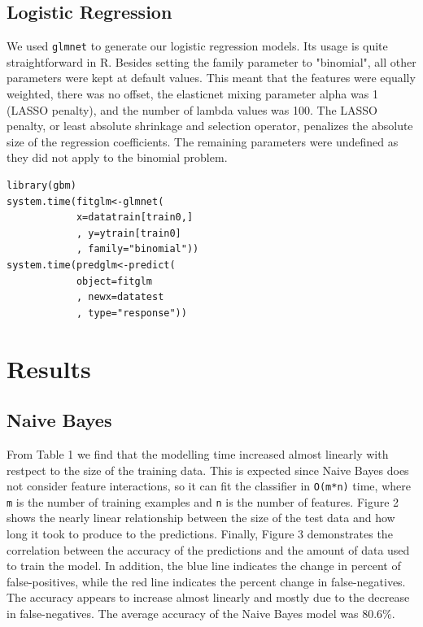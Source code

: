 \documentclass[twoside]{article}
\begin{document}
\begin{multicols}{2}
\subsection{Logistic Regression}
We used \texttt{glmnet} to generate our logistic regression models. Its usage is quite straightforward in R. Besides setting the family parameter to "binomial", all other parameters were kept at default values. This meant that the features were equally weighted, there was no offset, the elasticnet mixing parameter alpha was 1 (LASSO penalty), and the number of lambda values was 100\cite{4}. The LASSO penalty, or least absolute shrinkage and selection operator, penalizes the absolute size of the regression coefficients. The remaining parameters were undefined as they did not apply to the binomial problem.
\begin{verbatim}
library(gbm)
system.time(fitglm<-glmnet(
            x=datatrain[train0,]
            , y=ytrain[train0]
            , family="binomial"))
system.time(predglm<-predict(
            object=fitglm
            , newx=datatest
            , type="response"))
\end{verbatim}


\section{Results}

\subsection{Naive Bayes}

From Table 1 we find that the modelling time increased almost linearly with restpect to the size of the training data. This is expected since Naive Bayes does not consider feature interactions, so it can fit the classifier in \texttt{O(m*n)} time, where \texttt{m} is the number of training examples and \texttt{n} is the number of features. Figure 2 shows the nearly linear relationship between the size of the test data and how long it took to produce to the predictions. Finally, Figure 3 demonstrates the correlation between the accuracy of the predictions and the amount of data used to train the model. In addition, the blue line indicates the change in percent of false-positives, while the red line indicates the percent change in false-negatives. The accuracy appears to increase almost linearly and mostly due to the decrease in false-negatives. The average accuracy of the Naive Bayes model was 80.6\%.


\end{multicols}
\end{document}
